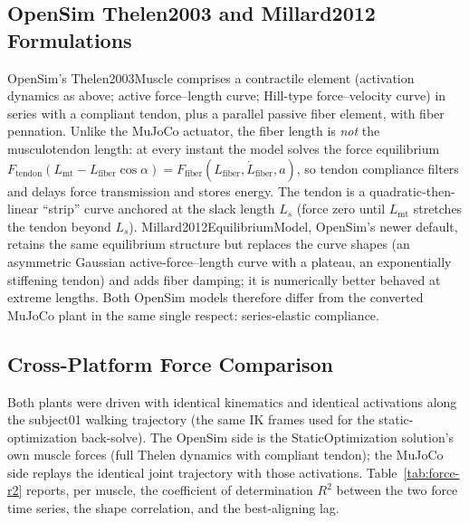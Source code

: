 \subsection{OpenSim Thelen2003 and Millard2012 Formulations}

OpenSim's Thelen2003Muscle comprises a contractile element (activation
dynamics as above; active force--length curve; Hill-type force--velocity
curve) in series with a compliant tendon, plus a parallel passive fiber
element, with fiber pennation. Unlike the MuJoCo actuator, the fiber
length is \emph{not} the musculotendon length: at every instant the
model solves the force equilibrium
$F_{\text{tendon}}(L_{\text{mt}} - L_{\text{fiber}}\cos\alpha)
 = F_{\text{fiber}}(L_{\text{fiber}}, \dot{L}_{\text{fiber}}, a)$,
so tendon compliance filters and delays force transmission and stores
energy. The tendon is a quadratic-then-linear ``strip'' curve anchored
at the slack length $L_s$ (force zero until $L_{\text{mt}}$ stretches
the tendon beyond $L_s$). Millard2012EquilibriumModel, OpenSim's newer
default, retains the same equilibrium structure but replaces the curve
shapes (an asymmetric Gaussian active-force--length curve with a
plateau, an exponentially stiffening tendon) and adds fiber damping; it
is numerically better behaved at extreme lengths. Both OpenSim models
therefore differ from the converted MuJoCo plant in the same single
respect: series-elastic compliance.

\subsection{Cross-Platform Force Comparison}
\label{sec:muscle-models-compare}

Both plants were driven with identical kinematics and identical
activations along the subject01 walking trajectory (the same IK frames
used for the static-optimization back-solve). The OpenSim side is the
StaticOptimization solution's own muscle forces (full Thelen dynamics
with compliant tendon); the MuJoCo side replays the identical joint
trajectory with those activations. Table~\ref{tab:force-r2} reports, per
muscle, the coefficient of determination $R^2$ between the two force
time series, the shape correlation, and the best-aligning lag.

